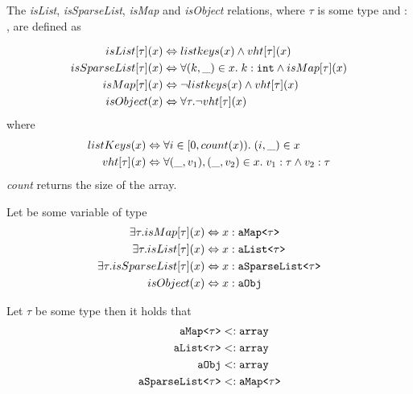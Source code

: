 \begin{definition} The \emph{isList},  \emph{isSparseList}, \emph{isMap} and \emph{isObject} relations, where $\tau$ is some type and \px{} : \parray, are defined as

\begin{align}
    isList[\tau](x) &\Leftrightarrow listkeys(x) \wedge vht[\tau](x)\\
    isSparseList[\tau](x) &\Leftrightarrow  \forall (k,\_) \in x.\;k : \texttt{int} \wedge isMap[\tau](x)\\
    isMap[\tau](x) &\Leftrightarrow \neg listkeys(x) \wedge vht[\tau](x)\\
    isObject(x) &\Leftrightarrow \forall \tau. \neg vht[\tau](x)
\end{align}
where 
\begin{align}
listKeys(x) &\Leftrightarrow \forall i \in [0, count(x)).\;(i, \_) \in x\\
vht[\tau](x) & \Leftrightarrow \forall (\_, v_1),(\_, v_2) \in x.\; v_1 : \tau \wedge v_2 : \tau
\end{align}
\emph{count} returns the size of the array.
\end{definition}

\begin{definition}
Let \px{} be some variable of type \parray{}
\begin{align}
\exists \tau. isMap[\tau](x) &\Leftrightarrow x : \texttt{aMap<$\tau$>} \label{eq:defMapMap}\\
\exists \tau. isList[\tau](x) &\Leftrightarrow x : \texttt{aList<$\tau$>}\label{eq:defLstLst} \\
\exists \tau. isSparseList[\tau](x) &\Leftrightarrow x : \texttt{aSparseList<$\tau$>}\label{eq:defLstLst} \\
isObject(x) &\Leftrightarrow x : \texttt{aObj} \label{eq:defObjObj}
\end{align}

Let $\tau$ be some type then it holds that
\begin{align}
    \texttt{aMap<$\tau$>} & <: \texttt{array}\\
    \texttt{aList<$\tau$>} & <: \texttt{array}\\
    \texttt{aObj} & <: \texttt{array}\\
    \texttt{aSparseList<$\tau$>} & <: \texttt{aMap<$\tau$>}
\end{align}
\begin{comment}
\begin{prooftree}
\AxiomC{$S <: T$} \AxiomC{$T <: S$}
\BinaryInfC{$\palst[S] <: \palst[T]$}
\end{prooftree}
\begin{prooftree}
\AxiomC{$S <: T$} \AxiomC{$T <: S$}
\BinaryInfC{$\pamap[S] <: \pamap[T]$}
\end{prooftree}
\end{comment}
\end{definition}

